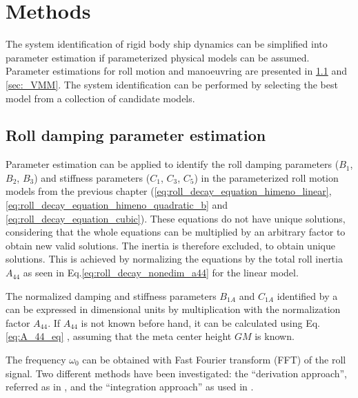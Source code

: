 \chapter{Methods\label{ch:methods}}
The system identification of rigid body ship dynamics can be simplified into parameter estimation if parameterized physical models can be assumed. Parameter estimations for roll motion and manoeuvring are presented in \ref{sec:_roll} and \ref{sec:_VMM}. The system identification can be performed by selecting the best model from a collection of candidate models.

\section{Roll damping parameter estimation} \label{sec:_roll}
\noindent Parameter estimation can be applied to identify the roll damping parameters ($B_1$, $B_2$, $B_3$) and stiffness parameters ($C_1$, $C_3$, $C_5$) in the parameterized roll motion models from the previous chapter (\autoref{eq:roll_decay_equation_himeno_linear}, \autoref{eq:roll_decay_equation_himeno_quadratic_b} and \autoref{eq:roll_decay_equation_cubic}). These equations do not have unique solutions, considering that the whole equations can be multiplied by an arbitrary factor to obtain new valid solutions. The inertia is therefore excluded, to obtain unique solutions. This is achieved by normalizing the equations by the total roll inertia $A_{44}$ as seen in Eq.\ref{eq:roll_decay_nonedim_a44} for the linear model.



\noindent The normalized damping and stiffness parameters $B_{1A}$ and $C_{1A}$ identified by a  can be expressed in dimensional units by multiplication with the normalization factor $A_{44}$. If $A_{44}$ is not known before hand, it can be calculated using Eq.\ref{eq:A_44_eq} \cite{piehl_ship_2016}, assuming that the meta center height $GM$ is known.


\noindent The frequency $\omega_0$ can be obtained with Fast Fourier transform (FFT) of the roll signal. 
Two different  methods have been investigated: the ``derivation approach'', referred as  in \parencite{imo_1200_2006}, and the ``integration approach'' as used in \cite{soder_assessment_2019}. 

